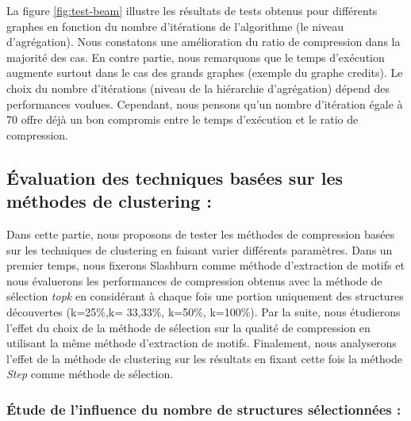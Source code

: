 	  La figure \ref{fig:test-beam} illustre les résultats de tests obtenus pour différents graphes en fonction du nombre d'itérations de l'algorithme (le niveau d'agrégation). Nous constatons une amélioration du ratio de compression dans la majorité des cas. En contre partie, nous remarquons que le temps d'exécution  augmente surtout dans le cas des grands graphes (exemple du graphe credits). Le choix du nombre d'itérations (niveau de la hiérarchie d'agrégation) dépend des performances voulues. Cependant, nous pensons qu'un  nombre d'itération égale à 70 offre déjà un bon compromis entre le temps d'exécution et le ratio de compression.
	
	\subsection{Évaluation des techniques basées sur les méthodes de clustering :}
	
	Dans cette partie, nous proposons de tester les méthodes de compression basées sur les techniques de clustering en faisant varier différents paramètres. Dans un premier temps, nous fixerons  Slashburn comme méthode d'extraction de motifs et nous évaluerons les performances de compression obtenus avec la méthode de sélection \textit{topk} en considérant à chaque fois une portion uniquement des structures découvertes (k=25\%,k= 33,33\%, k=50\%, k=100\%). Par la suite, nous étudierons l'effet  du choix de la méthode de sélection sur la qualité de compression en  utilisant la même méthode d'extraction de motifs. Finalement, nous analyserons l'effet de la méthode de clustering sur les résultats en fixant cette fois la méthode \textit{Step} comme méthode de sélection.
	
	
		
		\subsubsection{Étude de l'influence du nombre de structures sélectionnées :}
	

